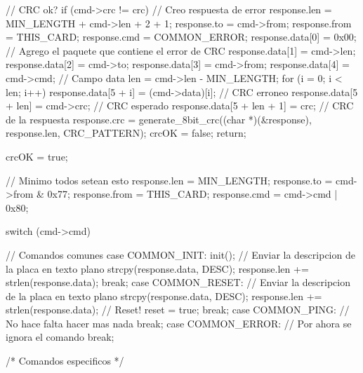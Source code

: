 {\begin{verbatimtab}
{	// CRC ok?
	if (cmd->crc != crc)
	{		
		// Creo respuesta de error
		response.len = MIN_LENGTH + cmd->len + 2 + 1;
		response.to = cmd->from;
		response.from = THIS_CARD;
		response.cmd = COMMON_ERROR;
		response.data[0] = 0x00;
		// Agrego el paquete que contiene el error de CRC
		response.data[1] = cmd->len;
		response.data[2] = cmd->to;
		response.data[3] = cmd->from;
		response.data[4] = cmd->cmd;
		// Campo data
		len = cmd->len - MIN_LENGTH;
		for (i = 0; i < len; i++)
			response.data[5 + i] = (cmd->data)[i];
		// CRC erroneo
		response.data[5 + len] = cmd->crc;
		// CRC esperado
		response.data[5 + len + 1] = crc;
		// CRC de la respuesta
		response.crc = generate_8bit_crc((char *)(&response), response.len, CRC_PATTERN);
		crcOK = false;
		return;
	}

	crcOK = true;
	
	// Minimo todos setean esto
	response.len = MIN_LENGTH;
	response.to = cmd->from & 0x77;
	response.from = THIS_CARD;
	response.cmd = cmd->cmd | 0x80;

	switch (cmd->cmd)
	{
		// Comandos comunes
		case COMMON_INIT:
			init();
			// Enviar la descripcion de la placa en texto plano
			strcpy(response.data, DESC);
			response.len += strlen(response.data);
		break;
		case COMMON_RESET:
			// Enviar la descripcion de la placa en texto plano
			strcpy(response.data, DESC);
			response.len += strlen(response.data);
			// Reset!
			reset = true;
		break;
		case COMMON_PING:
			// No hace falta hacer mas nada
		break;
 		case COMMON_ERROR:
			// Por ahora se ignora el comando
		break;
		
		/* Comandos especificos */

}}
\end{verbatimtab}}

